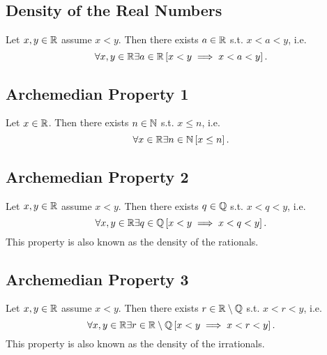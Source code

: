 \subsection{Density of the Real Numbers}
\uthm Let $x,y \in \mathbb{R}$ assume $x < y$. Then there exists $a \in \mathbb{R}$ s.t.
$x < a < y$, i.e.
\begin{equation*}
    \forall x, y \in \mathbb{R} \exists a \in \mathbb{R} \left[ x < y \implies x < a < y \right].
\end{equation*}


\subsection{Archemedian Property 1}
\uthm Let $x \in \mathbb{R}$. Then there exists $n \in \mathbb{N}$ s.t. $x \leq n$, i.e.
\begin{equation*}
    \forall x \in \mathbb{R} \exists n \in \mathbb{N} \left[ x \leq n \right].
\end{equation*}


\subsection{Archemedian Property 2}
\uthm Let $x,y \in \mathbb{R}$ assume $x < y$. Then there exists $q \in \mathbb{Q}$ s.t. $x < q < y$,
i.e.
\begin{equation*}
    \forall x, y \in \mathbb{R} \exists q \in \mathbb{Q} \left[ x < y \implies x < q < y \right].
\end{equation*}
This property is also known as the density of the rationals.


\subsection{Archemedian Property 3}
\uthm Let $x,y \in \mathbb{R}$ assume $x < y$. Then there exists $r \in \mathbb{R} \setminus \mathbb{Q}$
s.t. $x < r < y$, i.e.
\begin{equation*}
    \forall x, y \in \mathbb{R} \exists r \in \mathbb{R} \setminus \mathbb{Q} \left[ x < y \implies x < r < y \right].
\end{equation*}
This property is also known as the density of the irrationals.


